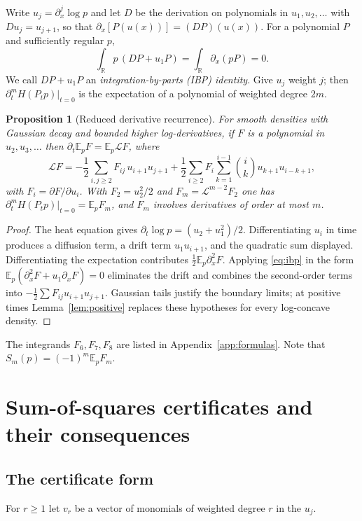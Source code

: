 \documentclass[11pt]{article}
\newtheorem{proposition}[theorem]{Proposition}
\theoremstyle{definition}
\theoremstyle{remark}
\newcommand{\R}{\mathbb R}
\newcommand{\E}{\mathbb E}
\begin{document}
Write $u_j=\partial_x^j\log p$ and let $D$ be the derivation on polynomials in
$u_1,u_2,\dots$ with $Du_j=u_{j+1}$, so that $\partial_x[P(u(x))]=(DP)(u(x))$.
For a polynomial $P$ and sufficiently regular $p$,
\begin{equation}\label{eq:ibp}
 \int_\R p\,(DP+u_1P)=\int_\R\partial_x(pP)=0 .
\end{equation}
We call $DP+u_1P$ an \emph{integration-by-parts (IBP) identity}. Give $u_j$ weight
$j$; then $\partial_t^mH(P_tp)|_{t=0}$ is the expectation of a polynomial of weighted
degree $2m$.

\begin{proposition}[Reduced derivative recurrence]\label{prop:recurrence}
For smooth densities with Gaussian decay and bounded higher log-derivatives, if $F$
is a polynomial in $u_2,u_3,\dots$ then $\partial_t\E_pF=\E_p\mathcal LF$, where
\[
 \mathcal LF=-\frac12\sum_{i,j\ge2}F_{ij}\,u_{i+1}u_{j+1}
 +\frac12\sum_{i\ge2}F_i\sum_{k=1}^{i-1}\binom ik u_{k+1}u_{i-k+1},
\]
with $F_i=\partial F/\partial u_i$. With $F_2=u_2^2/2$ and $F_m=\mathcal L^{m-2}F_2$
one has $\partial_t^mH(P_tp)|_{t=0}=\E_pF_m$, and $F_m$ involves derivatives of order
at most $m$.
\end{proposition}
\begin{proof}
The heat equation gives $\partial_t\log p=(u_2+u_1^2)/2$. Differentiating $u_i$ in time
produces a diffusion term, a drift term $u_1u_{i+1}$, and the quadratic sum displayed.
Differentiating the expectation contributes $\tfrac12\E_p\partial_x^2F$. Applying
\eqref{eq:ibp} in the form $\E_p(\partial_x^2F+u_1\partial_xF)=0$ eliminates the
drift and combines the second-order terms into $-\tfrac12\sum F_{ij}u_{i+1}u_{j+1}$.
Gaussian tails justify the boundary limits; at positive times
Lemma~\ref{lem:positive} replaces these hypotheses for every log-concave density.
\end{proof}
The integrands $F_6,F_7,F_8$ are listed in Appendix~\ref{app:formulas}. Note that
$S_m(p)=(-1)^m\E_pF_m$.

\section{Sum-of-squares certificates and their consequences}\label{sec:sos}

\subsection{The certificate form}
For $r\ge1$ let $v_r$ be a vector of monomials of weighted degree $r$ in the $u_j$.
\end{document}
